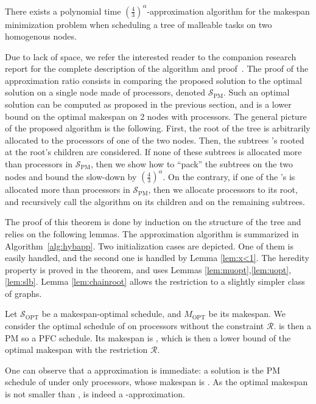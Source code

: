 \documentclass{llncs}
\newcommand{\spm}{\ensuremath{\mathcal{S}_{\mathrm{PM}}}\xspace}
\newcommand{\sopt}{\ensuremath{\mathcal{S}_{\mathrm{OPT}}}\xspace}
\newcommand{\mopt}{\ensuremath{{M}_{\mathrm{OPT}}}\xspace}
\newcommand{\R}{\ensuremath{\mathcal{R}}\xspace}
\newcommand{\frtrd}{\ensuremath{\left(\frac{4}{3}\right)^\alpha}}
\newif\iflong
\begin{document}
\begin{theorem}
\label{th.43approx}
  There exists a polynomial time \frtrd-approximation algorithm for
  the makespan minimization problem when scheduling a tree of malleable tasks on
  two homogenous nodes.
\end{theorem}

\iflong\else Due to lack of space, we refer the interested reader to
the companion research report
for the complete description of the
algorithm and proof~\cite{RR-ipdps-2014}.  The proof of the
approximation ratio consists in comparing the proposed solution to the
optimal solution on a single node made of  processors, denoted
\spm. Such an optimal solution can be computed as proposed in the
previous section, and is a lower bound on the optimal makespan on 2
nodes with  processors. The general picture of the proposed
algorithm is the following. First, the root of the tree is arbitrarily
allocated to
the  processors of one of the two nodes. Then, the subtrees 's
rooted at the root's children are considered. If none of these
subtrees is allocated more than  processors in \spm, then we show
how to ``pack'' the subtrees on the two nodes and bound the slow-down
by \frtrd. On the contrary, if one of the 's is allocated more
than  processors in \spm, then we allocate  processors to its
root, and recursively call the algorithm on  its children and on the
remaining subtrees.
\fi

\iflong
The proof of this theorem is done by induction on the structure of the
tree and relies on the following lemmas. The approximation algorithm
is summarized in Algorithm~\ref{alg:hybapp}.  Two initialization cases
are depicted. One of them is easily handled, and the second one is
handled by Lemma \ref{lem:x<1}. The heredity property is proved in the
theorem, and uses Lemmas
\ref{lem:muopt},\ref{lem:uopt},\ref{lem:slb}. Lemma
\ref{lem:chainroot} allows the restriction to a slightly simpler class
of graphs.


Let \sopt be a makespan-optimal schedule, and \mopt be its makespan.
We consider the optimal schedule  of  on  processors
without the constraint \R.  is then a PM so a PFC schedule. Its
makespan is , which is then a
lower bound of the optimal makespan with the restriction \R.

One can observe that a  approximation is immediate: a
solution is the PM schedule of  under only  processors, whose
makespan is . As the optimal makespan
is not smaller than ,  is indeed a
-approximation.
\end{document}
